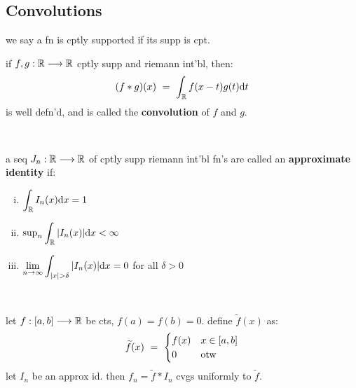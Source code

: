 \subsection{Convolutions}
we say a fn is cptly supported if its supp is cpt.
\begin{defn}
	if $f,g:\mathbb{R}\longrightarrow\mathbb{R}$ cptly supp and riemann int'bl, then:
	\begin{equation*}
		(f*g)(x) \ = \ \int_{\bR}f(x-t)g(t)\d t
	\end{equation*}
	is well defn'd, and is called the \textbf{convolution} of $f$ and $g$.
\end{defn} \

\begin{defn}
	a seq $J_{n}:\mathbb{R}\longrightarrow\mathbb{R}$  of cptly supp riemann int'bl fn's are
	called an \textbf{approximate identity} if:
	\begin{enumerate}[(i)]
		\item $\displaystyle\int_{\mathbb{R}}I_{n}(x)\textrm{d} x=1$
		\item $\sup_{n}\displaystyle\int_{\mathbb{R}}\abs{I_{n}(x)}\textrm{d} x<\infty$
		\item $\displaystyle\lim_{n\rightarrow\infty}\int_{\abs{x}>\delta}\abs{I_{n}(x)}\textrm{d} x=0$
			for all $\delta>0$
	\end{enumerate}
\end{defn} \

\begin{thm}
	let $f:[a,b]\longrightarrow\mathbb{R}$ be cts, $f(a)=f(b)=0$. define $\tilde{f}(x)$ as:
	\begin{equation*}
		\widetilde{f}(x) \ = \
		\begin{cases}
			f(x) & x\in[a,b] \\ 0 & \textrm{otw}
		\end{cases}
	\end{equation*}
	let $I_{n}$ be an approx id.
	then $f_{n}=\tilde{f}*I_{n}$ cvgs uniformly to $\tilde{f}$.
\end{thm} \

